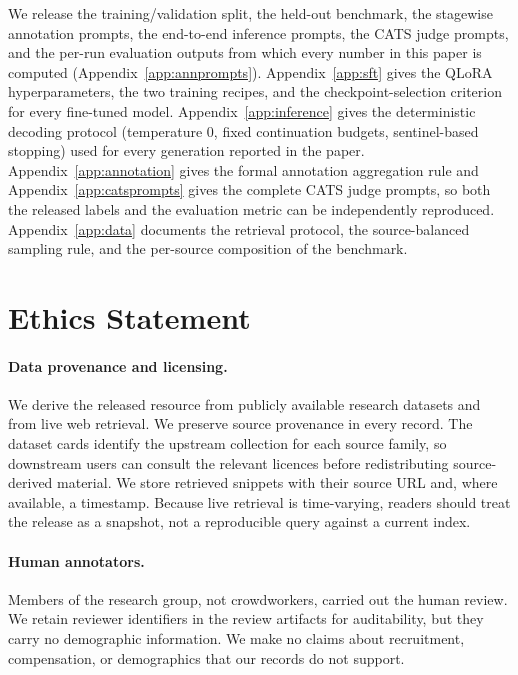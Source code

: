We release the training/validation split, the held-out benchmark, the
stagewise annotation prompts, the end-to-end inference prompts, the CATS
judge prompts, and the per-run evaluation outputs from which every number in
this paper is computed (Appendix~\ref{app:annprompts}). Appendix~\ref{app:sft}
gives the QLoRA hyperparameters, the two training recipes, and the
checkpoint-selection criterion for every fine-tuned model.
Appendix~\ref{app:inference} gives the deterministic decoding protocol
(temperature $0$, fixed continuation budgets, sentinel-based stopping) used
for every generation reported in the paper. Appendix~\ref{app:annotation}
gives the formal annotation aggregation rule and Appendix~\ref{app:catsprompts}
gives the complete CATS judge prompts, so both the released labels and the
evaluation metric can be independently reproduced. Appendix~\ref{app:data}
documents the retrieval protocol, the source-balanced sampling rule, and the
per-source composition of the benchmark.

\section*{Ethics Statement}

\paragraph{Data provenance and licensing.} We derive the released resource from
publicly available research datasets and from live web retrieval. We preserve
source provenance in every record. The dataset cards identify the
upstream collection for each source family, so downstream users can consult
the relevant licences before redistributing source-derived material. We store
retrieved snippets with their source URL and, where available, a timestamp.
Because live retrieval is time-varying, readers should treat the release as a
snapshot, not a reproducible query against a current index.

\paragraph{Human annotators.} Members of the research group, not crowdworkers,
carried out the human review. We retain reviewer identifiers in
the review artifacts for auditability, but they carry no demographic information.
We make no claims about recruitment, compensation, or demographics that our
records do not support.

